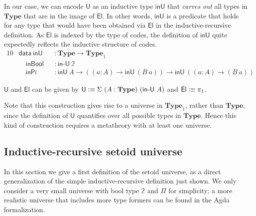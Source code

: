 \documentclass[autoref]{llncs}
\newcommand{\inU}{\mathsf{inU}}
\newcommand{\mType}{\mathbf{Type}}
\newcommand{\U}{\textsf{U}}
\newcommand{\El}{\textsf{El}}
\providecommand\mathbbm{\mathbb}
\newcommand{\defeq}{\mathrel{\vcentcolon\equiv}}
\begin{document}
In our case, we can encode $\U$ as an inductive type $\inU$ that
\emph{carves out} all types in $\mType$ that are in the image of $\El$. In other
words, $\inU$ is a predicate that holds for any type that would have been
obtained via $\El$ in the inductive-recursive definition. As $\El$ is indexed by
the type of codes, the definition of $\inU$ quite expectedly reflects the
inductive structure of codes.
\vspace{-0.2em}
\begin{alignat*}{10}
  & \textsf{data}\ \inU && : \mType \to \mType_1 \\
  & \quad \textsf{inBool} && : \textsf{in-U}\ \mathbbm{2} \\
  & \quad \textsf{inPi} && :  \inU\ A \to ((a : A) \to \inU\ (B\ a)) \to \inU\ ((a : A) \to (B\ a))
\end{alignat*}

$\U$ and $\El$ can be given by $\U \defeq \Sigma\ (A : \mType)\ (\textsf{in-U}\ A)$ and $\El \defeq \pi_1$.

Note that this construction gives rise to a universe in $\mType_1$, rather than
$\mType$, since the definition of $\U$ quantifies over all possible types in
$\mType$. Hence this kind of construction requires a metatheory with at least
one universe.

\subsection{Inductive-recursive setoid universe}\label{ir-setoid-universe}

In this section we give a first definition of the setoid universe, as a direct
generalization of the simple inductive-recursive definition just shown. We only
consider a very small universe with bool type $\mathbbm{2}$ and $\Pi$ for
simplicity; a more realistic universe that includes more type formers
can be found in the Agda formalization.
\end{document}
